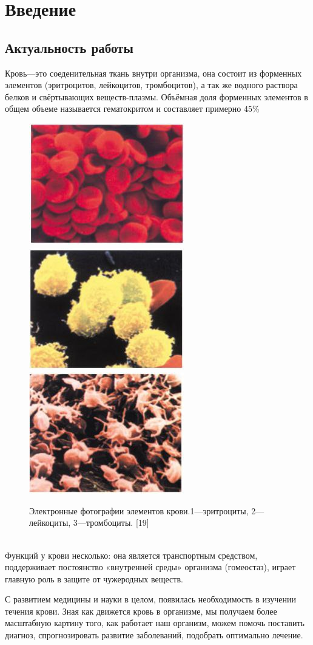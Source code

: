 \documentclass[a4paper, 14pt]{article}
\begin{document}
\newpage
\tableofcontents
\newpage
\section{Введение}
\subsection{Актуальность работы}
Кровь—это соеденительная ткань внутри организма, она состоит из форменных элементов (эритроцитов, лейкоцитов, тромбоцитов), а так же водного раствора белков и свёртывающих веществ-плазмы. Объёмная доля форменных элементов в общем объеме называется гематокритом и составляет примерно 45\%
\begin{figure}[h]
\centering
\includegraphics[width=0.3\linewidth]{erotr.jpg}
\includegraphics[width=0.3\linewidth]{leiko.jpg}
\includegraphics[width=0.3\linewidth]{trombo.jpg}
\caption{ Электронные фотографии элементов крови.1—эритроциты, 2—лейкоциты, 3—тромбоциты. [19]}
\label{fig:mpr}
\end{figure}\\

Функций у крови несколько: она является транспортным средством, поддерживает постоянство «внутренней среды» организма (гомеостаз), играет главную роль в защите от чужеродных веществ.

С развитием медицины и науки в целом, появилась необходимость в изучении течения крови. Зная как движется кровь в организме, мы получаем более масштабную картину того, как работает наш организм, можем помочь поставить диагноз, спрогнозировать развитие заболеваний, подобрать оптимально лечение.
\end{document}
